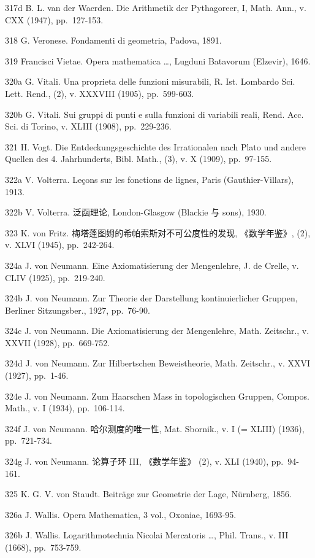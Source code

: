 317d B. L. van der Waerden. Die Arithmetik der Pythagoreer, I, Math. Ann., v. CXX (1947), pp.~127-153.

318 G. Veronese. Fondamenti di geometria, Padova, 1891.

319 Francisci Vietae. Opera mathematica \ldots, Lugduni Batavorum (Elzevir), 1646.

320a G. Vitali. Una proprieta delle funzioni misurabili, R. Ist. Lombardo Sci. Lett. Rend., (2), v. XXXVIII (1905), pp.~599-603.

320b G. Vitali. Sui gruppi di punti e sulla funzioni di variabili reali, Rend. Acc. Sci. di Torino, v. XLIII (1908), pp.~229-236.

321 H. Vogt. Die Entdeckungsgeschichte des Irrationalen nach Plato und andere Quellen des 4. Jahrhunderts, Bibl. Math., (3), v. X (1909), pp.~97-155.

322a V. Volterra. Leçons sur les fonctions de lignes, Paris (Gauthier-Villars), 1913.

322b V. Volterra. 泛函理论, London-Glasgow (Blackie 与 sons), 1930.

323 K. von Fritz. 梅塔蓬图姆的希帕索斯对不可公度性的发现, 《数学年鉴》, (2), v. XLVI (1945), pp.~242-264.

324a J. von Neumann. Eine Axiomatisierung der Mengenlehre, J. de Crelle, v. CLIV (1925), pp.~219-240.

324b J. von Neumann. Zur Theorie der Darstellung kontinuierlicher Gruppen, Berliner Sitzungsber., 1927, pp.~76-90.

324c J. von Neumann. Die Axiomatisierung der Mengenlehre, Math. Zeitschr., v. XXVII (1928), pp.~669-752.

324d J. von Neumann. Zur Hilbertschen Beweistheorie, Math. Zeitschr., v. XXVI (1927), pp.~1-46.

324e J. von Neumann. Zum Haarschen Mass in topologischen Gruppen, Compos. Math., v. I (1934), pp.~106-114.

324f J. von Neumann. 哈尔测度的唯一性, Mat. Sbornik., v. I (= XLIII) (1936), pp.~721-734.

324g J. von Neumann. 论算子环 III, 《数学年鉴》 (2), v. XLI (1940), pp.~94-161.

325 K. G. V. von Staudt. Beiträge zur Geometrie der Lage, Nürnberg, 1856.

326a J. Wallis. Opera Mathematica, 3 vol., Oxoniae, 1693-95.

326b J. Wallis. Logarithmotechnia Nicolai Mercatoris \ldots, Phil. Trans., v. III (1668), pp.~753-759.

